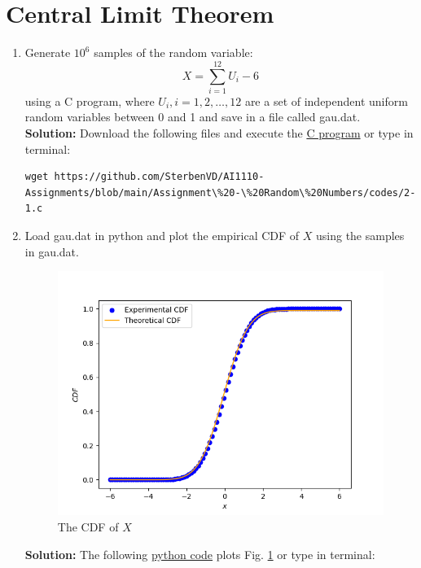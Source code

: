 \documentclass[journal,12pt,onecolumn]{IEEEtran}
\numberwithin{equation}{section}
\renewcommand\thesection{\arabic{section}}
\providecommand{\gitlink}[2]{{\color{blue}\href{https://github.com/SterbenVD/AI1110-Assignments/blob/main/Assignment\%20-\%20Random\%20Numbers/#1}{#2}}}
\newcommand{\solution}{\noindent \textbf{Solution: }}
\begin{document}
\section{Central Limit Theorem}
\begin{enumerate}[label=\thesection.\arabic*,ref=\thesection.\theenumi]
    \item Generate $10^6$ samples of the random variable:
          \begin{equation}
              X = \sum_{i=1}^{12}U_i -6
          \end{equation}
          using a C program, where $U_i, i = 1,2,\dots, 12$ are  a set of independent uniform random variables between 0 and 1
          and save in a file called gau.dat.
          \\
          \solution Download the following files and execute the \gitlink{codes/2-1.c}{C program} or type in terminal:
          \begin{lstlisting}
wget https://github.com/SterbenVD/AI1110-Assignments/blob/main/Assignment\%20-\%20Random\%20Numbers/codes/2-1.c
            \end{lstlisting}
    \item Load gau.dat in python and plot the empirical CDF of $X$ using the samples in gau.dat.
          \begin{figure}[H]
              \centering
              \includegraphics[scale = 0.7]{../figs/2_cdf}
              \caption{The CDF of $X$}
              \label{fig:2_cdf}
          \end{figure}
          \solution The following \gitlink{codes/2-2.py}{python code} plots Fig. \ref{fig:2_cdf}  or type in terminal:

\end{enumerate}
\end{document}
